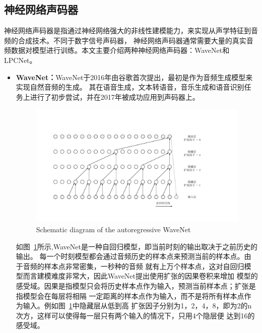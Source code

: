 \subsection{神经网络声码器}
神经网络声码器是指通过神经网络强大的非线性建模能力，来实现从声学特征到音频的合成技术。不同于数字信号声码器，
神经网络声码器通常需要大量的真实音频数据对模型进行训练。本文主要介绍两种神经网络声码器：WaveNet和LPCNet。

\begin{itemize}
    \item \textbf{WaveNet：}WaveNet于2016年由谷歌首次提出，最初是作为音频生成模型来实现自然音频的生成\cite{oord2016wavenet}。
    其在语音生成，文本转语音，音乐生成和语音识别任务上进行了初步尝试，并在2017年被成功应用到声码器上\cite{tamamori2017speaker}。
    
    \begin{figure}[!htp]
        \centering
        \includegraphics[width=13cm,trim=30 50 130 80,clip]{figure/2_wavenet.pdf}
        {Schematic diagram of the autoregressive WaveNet}
        \label{fig:wavenet}
    \end{figure}

    如图~\ref{fig:wavenet}所示,WaveNet是一种自回归模型，即当前时刻的输出取决于之前历史的输出。
    每一个时刻模型都会通过音频历史的样本点来预测当前的样本点。由于音频的样本点非常密集，一秒种的音频
    就有上万个样本点，这对自回归模型而言建模难度非常大，因此WaveNet提出使用扩张的因果卷积来增加
    模型的感受域。因果是指模型只会将历史样本点作为输入，预测当前样本点；扩张是指模型会在每层将相隔
    一定距离的样本点作为输入，而不是将所有样本点作为输入。例如图~\ref{fig:wavenet}中隐藏层从低到高
    扩张因子分别为1，2，4，8，即为2的n次方，这样可以使得每一层只有两个输入的情况下，只用4个隐层便
    达到16的感受域。


\end{itemize}
